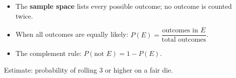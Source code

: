 \documentclass[10pt]{article}
\begin{document}
\vspace{0.14in}

\begin{tcolorbox}[colback=greenbg, colframe=greenacc, boxrule=0.8pt, arc=2mm,
    left=4mm, right=4mm, top=3mm, bottom=3mm]
    \small
    \begin{itemize}[leftmargin=1.3em, itemsep=8pt]
  \item The \textbf{sample space} lists every possible outcome; no outcome is counted twice.
  \item When all outcomes are equally likely: $P(E) = \dfrac{\text{outcomes in }E}{\text{total outcomes}}$.
  \item The complement rule: $P(\text{not }E) = 1 - P(E)$.
    \end{itemize}
\end{tcolorbox}

\vspace{0.2in}

\noindent\textcolor{slate}{\small Estimate: probability of rolling 3 or higher on a fair die.}\\[8pt]
\end{document}
